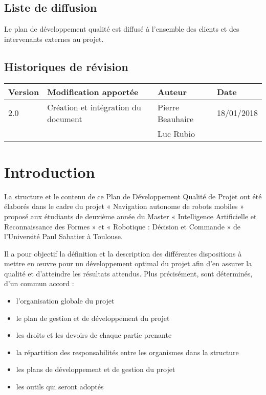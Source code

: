 \documentclass[10pt,a4paper]{article}
\begin{document}
\subsection*{Liste de diffusion}

Le plan de développement qualité est diffusé à l'ensemble des clients et des intervenants externes au projet.

\subsection*{Historiques de révision}

\begin{center}
    \begin{tabular}{| l | l | l | l |}
    \hline
     \rowcolor{gray} Version & Modification apportée & Auteur & Date \\ \hline
    2.0 & Création et intégration du document & Pierre Beauhaire & 18/01/2018\\
     & & Luc Rubio & \\
     \hline
     
    \end{tabular}
\end{center}

\newpage
\tableofcontents
\newpage
	

\section{Introduction}
\label{sec:introduction}

La structure et le contenu de ce Plan de Développement Qualité de Projet ont été élaborés dans le cadre du projet « Navigation autonome de robots mobiles » proposé aux étudiants de deuxième année du Master « Intelligence Artificielle et Reconnaissance des Formes » et « Robotique : Décision et Commande » de l'Université Paul Sabatier à Toulouse.

Il a pour objectif la définition et la description des différentes dispositions à mettre en œuvre pour un développement optimal du projet afin d’en assurer la qualité et d’atteindre les résultats attendus. Plus précisément, sont déterminés, d’un commun accord :
\begin{itemize}
\item l’organisation globale du projet 
\item le plan de gestion et de développement du projet
\item les droits et les devoirs de chaque partie prenante
\item la répartition des responsabilités entre les organismes dans la structure
\item les plans de développement et de gestion du projet
\item les outils qui seront adoptés 
\end{itemize}
\end{document}
